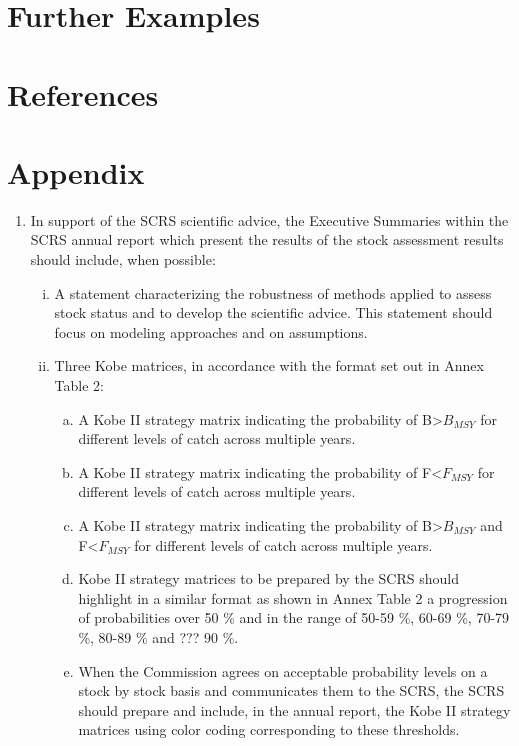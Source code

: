 \documentclass[a4paper, 11pt, oldtoc]{artikel1}
\begin{document}
\section*{Further Examples}


\section*{References}

\section*{Appendix}

  \begin{enumerate}
    \item  In support of the SCRS scientific advice, the Executive Summaries within the SCRS annual report which present the results of the stock assessment results should include, when possible: 
    \begin{enumerate}[i)]
      \item A statement characterizing the robustness of methods applied to assess stock status and to develop the scientific advice. This statement should focus on modeling approaches and on assumptions.
      \item Three Kobe matrices, in accordance with the format set out in Annex Table 2:
      \begin{enumerate}[(a)]
         \item A Kobe II strategy matrix indicating the probability of B>$B_{MSY}$ for different levels of catch across multiple years.
         \item A Kobe II strategy matrix indicating the probability of F<$F_{MSY}$ for different levels of catch across multiple years.
         \item A Kobe II strategy matrix indicating the probability of B>$B_{MSY}$ and F<$F_{MSY}$ for different levels of catch across multiple years.
         \item Kobe II strategy matrices to be prepared by the SCRS should highlight in a similar format as shown in Annex Table 2 a progression 
                 of probabilities over 50 \% and in the range of 50-59 \%, 60-69 \%, 70-79 \%, 80-89 \% and ??? 90 \%. 
         \item When the Commission agrees on acceptable probability levels on a stock by stock basis and communicates them to the SCRS, 
                 the SCRS should prepare and include, in the annual report, the  Kobe II strategy matrices using color coding corresponding to these thresholds.
      \end{enumerate}


\end{enumerate}
\end{enumerate}
\end{document}
